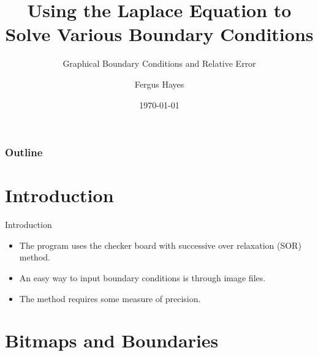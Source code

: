 \documentclass{beamer}
\title{Using the Laplace Equation to Solve Various Boundary Conditions}
\subtitle{Graphical Boundary Conditions and Relative Error}
\author{Fergus Hayes}
\date{\today}
\begin{document}
\begin{frame}
\titlepage
\end{frame}
\begin{frame}
\frametitle{Outline}
\tableofcontents
\end{frame}
\section{Introduction}
\begin{frame}{Introduction}
\begin{itemize}
\item The program uses the checker board with successive over relaxation (SOR) method.
\item An easy way to input boundary conditions is through image files.
\item The method requires some measure of precision. 
\end{itemize}
\end{frame}
\section{Bitmaps and Boundaries}
\end{document}
